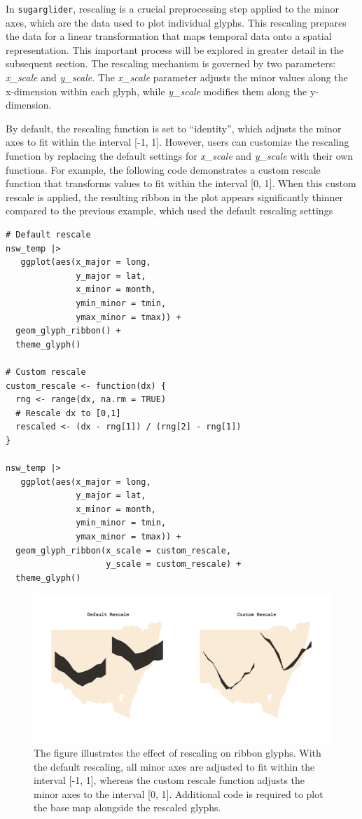 In \texttt{sugarglider}, rescaling is a crucial preprocessing step applied to the minor axes, which are the data used to plot individual glyphs. This rescaling prepares the data for a linear transformation that maps temporal data onto a spatial representation. This important process will be explored in greater detail in the subsequent section. The rescaling mechanism is governed by two parameters: \emph{x\_scale} and \emph{y\_scale}. The \emph{x\_scale} parameter adjusts the minor values along the x-dimension within each glyph, while \emph{y\_scale} modifies them along the y-dimension.

By default, the rescaling function is set to ``identity'', which adjusts the minor axes to fit within the interval {[}-1, 1{]}. However, users can customize the rescaling function by replacing the default settings for \emph{x\_scale} and \emph{y\_scale} with their own functions. For example, the following code demonstrates a custom rescale function that transforms values to fit within the interval {[}0, 1{]}. When this custom rescale is applied, the resulting ribbon in the plot appears significantly thinner compared to the previous example, which used the default rescaling settings

\begin{verbatim}
# Default rescale 
nsw_temp |>
   ggplot(aes(x_major = long,
              y_major = lat,
              x_minor = month,
              ymin_minor = tmin,
              ymax_minor = tmax)) +
  geom_glyph_ribbon() +
  theme_glyph() 

# Custom rescale 
custom_rescale <- function(dx) {
  rng <- range(dx, na.rm = TRUE)
  # Rescale dx to [0,1]
  rescaled <- (dx - rng[1]) / (rng[2] - rng[1])
}

nsw_temp |>
   ggplot(aes(x_major = long,
              y_major = lat,
              x_minor = month,
              ymin_minor = tmin,
              ymax_minor = tmax)) +
  geom_glyph_ribbon(x_scale = custom_rescale,
                    y_scale = custom_rescale) +
  theme_glyph() 
\end{verbatim}

\begin{figure}
\includegraphics[width=50in]{figures/custom_rescale} \caption{The figure illustrates the effect of rescaling on ribbon glyphs. With the default rescaling, all minor axes are adjusted to fit within the interval [-1, 1], whereas the custom rescale function adjusts the minor axes to the interval [0, 1]. Additional code is required to plot the base map alongside the rescaled glyphs.}\label{fig:defaultRescale}
\end{figure}

